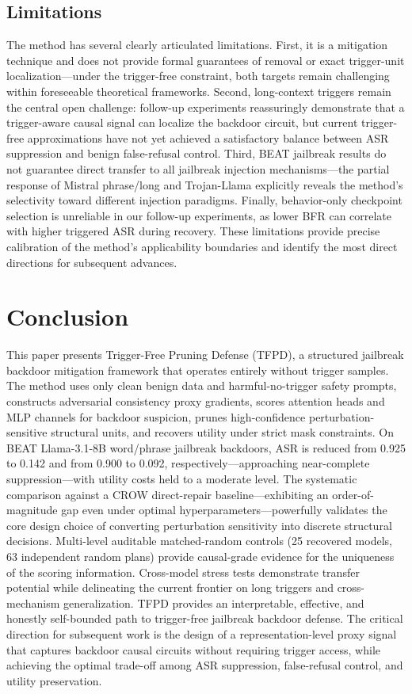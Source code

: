\documentclass[lettersize,journal]{IEEEtran}
\begin{document}
\subsection{Limitations}
The method has several clearly articulated limitations. First, it is a mitigation technique and does not provide formal guarantees of removal or exact trigger-unit localization---under the trigger-free constraint, both targets remain challenging within foreseeable theoretical frameworks. Second, long-context triggers remain the central open challenge: follow-up experiments reassuringly demonstrate that a trigger-aware causal signal can localize the backdoor circuit, but current trigger-free approximations have not yet achieved a satisfactory balance between ASR suppression and benign false-refusal control. Third, BEAT jailbreak results do not guarantee direct transfer to all jailbreak injection mechanisms---the partial response of Mistral phrase/long and Trojan-Llama explicitly reveals the method's selectivity toward different injection paradigms. Finally, behavior-only checkpoint selection is unreliable in our follow-up experiments, as lower BFR can correlate with higher triggered ASR during recovery. These limitations provide precise calibration of the method's applicability boundaries and identify the most direct directions for subsequent advances.

\section{Conclusion}
This paper presents Trigger-Free Pruning Defense (TFPD), a structured jailbreak backdoor mitigation framework that operates entirely without trigger samples. The method uses only clean benign data and harmful-no-trigger safety prompts, constructs adversarial consistency proxy gradients, scores attention heads and MLP channels for backdoor suspicion, prunes high-confidence perturbation-sensitive structural units, and recovers utility under strict mask constraints. On BEAT Llama-3.1-8B word/phrase jailbreak backdoors, ASR is reduced from 0.925 to 0.142 and from 0.900 to 0.092, respectively---approaching near-complete suppression---with utility costs held to a moderate level. The systematic comparison against a CROW direct-repair baseline---exhibiting an order-of-magnitude gap even under optimal hyperparameters---powerfully validates the core design choice of converting perturbation sensitivity into discrete structural decisions. Multi-level auditable matched-random controls (25 recovered models, 63 independent random plans) provide causal-grade evidence for the uniqueness of the scoring information. Cross-model stress tests demonstrate transfer potential while delineating the current frontier on long triggers and cross-mechanism generalization. TFPD provides an interpretable, effective, and honestly self-bounded path to trigger-free jailbreak backdoor defense. The critical direction for subsequent work is the design of a representation-level proxy signal that captures backdoor causal circuits without requiring trigger access, while achieving the optimal trade-off among ASR suppression, false-refusal control, and utility preservation.
\end{document}
